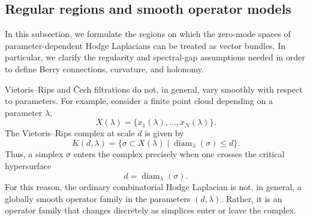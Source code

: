 \documentclass[pdflatex,sn-mathphys-num]{sn-jnl}%
\theoremstyle{thmstyleone}%
\theoremstyle{thmstyletwo}%
\theoremstyle{thmstylethree}%
\begin{document}










\subsection{Regular regions and smooth operator models}

In this subsection, we formulate the regions on which the zero-mode spaces of
parameter-dependent Hodge Laplacians can be treated as vector bundles. In
particular, we clarify the regularity and spectral-gap assumptions needed in
order to define Berry connections, curvature, and holonomy.

Vietoris--Rips and \v{C}ech filtrations do not, in general, vary smoothly with
respect to parameters. For example, consider a finite point cloud depending on a
parameter \(\lambda\),
\[
X(\lambda)=\{x_1(\lambda),\dots,x_N(\lambda)\}.
\]
The Vietoris--Rips complex at scale \(d\) is given by
\[
K(d,\lambda)
=
\{\sigma\subset X(\lambda)\mid \operatorname{diam}_\lambda(\sigma)\le d\}.
\]
Thus, a simplex \(\sigma\) enters the complex precisely when one crosses the
critical hypersurface
\[
d=\operatorname{diam}_\lambda(\sigma).
\]
For this reason, the ordinary combinatorial Hodge Laplacian is not, in general,
a globally smooth operator family in the parameters \((d,\lambda)\). Rather, it
is an operator family that changes discretely as simplices enter or leave the
complex.
\end{document}
